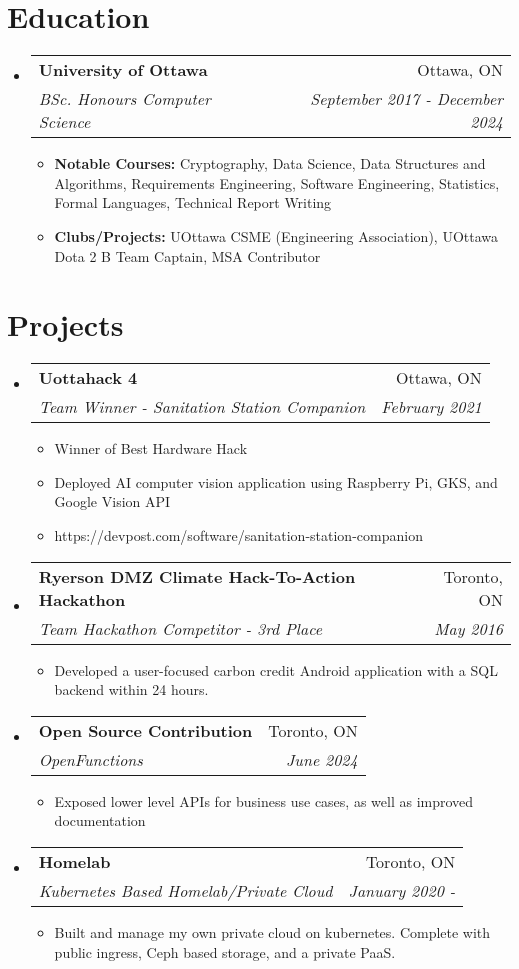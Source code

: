 \documentclass[letterpaper,11pt]{article}
\makeatletter
\newcommand{\resumeItem}[2]{
  \item\small{
    \textbf{#1}{#2 \vspace{-2pt}}
  }
}
\newcommand{\resumeSubheading}[4]{
  \vspace{-1pt}\item
    \begin{tabular*}{0.97\textwidth}[t]{l@{\extracolsep{\fill}}r}
      \textbf{#1} & #2 \\
      \textit{\small#3} & \textit{\small #4} \\
    \end{tabular*}\vspace{-5pt}
}
\newcommand{\resumeSubHeadingListStart}{\begin{itemize}[leftmargin=*]}
\newcommand{\resumeSubHeadingListEnd}{\end{itemize}}
\newcommand{\resumeItemListStart}{\begin{itemize}}
\newcommand{\resumeItemListEnd}{\end{itemize}\vspace{-5pt}}
\makeatother
\begin{document}
\section{Education}
\resumeSubHeadingListStart
  \resumeSubheading
    {University of Ottawa}{Ottawa, ON}
    {BSc. Honours Computer Science}{September 2017 - December 2024}
    \resumeItemListStart
      \resumeItem{Notable Courses: }{Cryptography, Data Science, Data Structures and Algorithms, Requirements Engineering, Software Engineering, Statistics, Formal Languages, Technical Report Writing}
      \resumeItem{Clubs/Projects: }{UOttawa CSME (Engineering Association), UOttawa Dota 2 B Team Captain, MSA Contributor}
    \resumeItemListEnd
\resumeSubHeadingListEnd

\section{Projects}
\resumeSubHeadingListStart
  \resumeSubheading
  {Uottahack 4}{Ottawa, ON}
  {Team Winner - Sanitation Station Companion}{February 2021}
    \resumeItemListStart
      \resumeItem{}
      {Winner of Best Hardware Hack}
      \resumeItem{}
      {Deployed AI computer vision application using Raspberry Pi, GKS, and Google Vision API}
      \resumeItem{}
      {https://devpost.com/software/sanitation-station-companion}
    \resumeItemListEnd
  \resumeSubheading
  {Ryerson DMZ Climate Hack-To-Action Hackathon}{Toronto, ON}
  {Team Hackathon Competitor - 3rd Place}{May 2016}
    \resumeItemListStart
      \resumeItem{}
      {Developed a user-focused carbon credit Android application with a SQL backend within 24 hours.}
    \resumeItemListEnd
  \resumeSubheading
  {Open Source Contribution}{Toronto, ON}
  {OpenFunctions}{June 2024}
    \resumeItemListStart
      \resumeItem{}
      {Exposed lower level APIs for business use cases, as well as improved documentation}
    \resumeItemListEnd
  \resumeSubheading
  {Homelab}{Toronto, ON}
  {Kubernetes Based Homelab/Private Cloud}{January 2020 -}
    \resumeItemListStart
      \resumeItem{}
      {Built and manage my own private cloud on kubernetes. Complete with public ingress, Ceph based storage, and a private PaaS.}
    \resumeItemListEnd
\resumeSubHeadingListEnd

\end{document}

